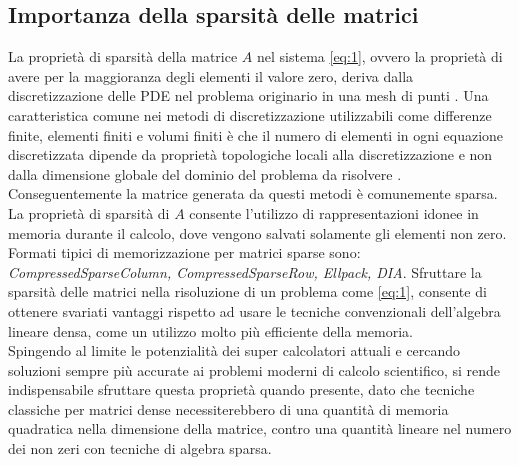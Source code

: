 \subsection{Importanza della sparsità delle matrici}
La proprietà di sparsità della matrice $A$  nel sistema \ref{eq:1}, ovvero la proprietà di avere per la maggioranza degli elementi il valore zero,
deriva dalla discretizzazione delle PDE nel problema originario in una mesh di punti \cite{sparseLinearSolverTR}.
Una caratteristica comune nei metodi di discretizzazione utilizzabili come differenze finite, elementi finiti e volumi finiti 
è che il numero di elementi in ogni equazione discretizzata dipende da proprietà topologiche locali alla discretizzazione
e non dalla dimensione globale del dominio del problema da risolvere \cite{spMVfanf,pdeSparsfd1,pdeSparsfd2,pdeSparsfd3}.
Conseguentemente la matrice generata da questi metodi è comunemente sparsa.\voidLine
La proprietà di sparsità di $A$ consente l'utilizzo di rappresentazioni idonee in memoria durante il calcolo, 
dove vengono salvati solamente gli elementi non zero.\\
Formati tipici di memorizzazione per matrici sparse sono: \emph{CompressedSparseColumn, CompressedSparseRow, Ellpack, DIA}.%
\voidLine	%
Sfruttare la sparsità delle matrici nella risoluzione di un problema come \ref{eq:1}, consente di ottenere svariati vantaggi
rispetto ad usare le tecniche convenzionali dell'algebra lineare densa, come un utilizzo molto più efficiente della memoria.\\
Spingendo al limite le potenzialità dei super calcolatori attuali e cercando soluzioni sempre più accurate ai problemi moderni di calcolo scientifico,
si rende indispensabile sfruttare questa proprietà quando presente,
dato che tecniche classiche per matrici dense necessiterebbero di una quantità di memoria 
quadratica nella dimensione della matrice, contro una quantità lineare nel numero dei non zeri con tecniche di algebra sparsa.
\voidLine	%

